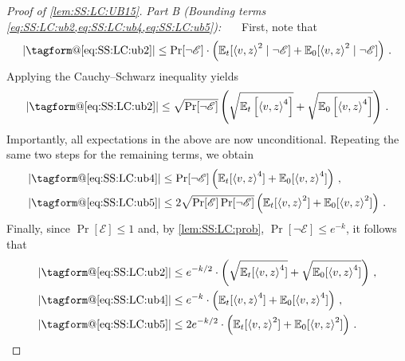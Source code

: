 \documentclass[11pt,letterpaper]{article}
\makeatletter
\theoremstyle{plain}
\theoremstyle{definition}
\theoremstyle{remark}
\renewcommand{\eqref}[1]{\textup{\eqrefform@{\ref{#1}}}}
\let\eqrefform@\tagform@
\def\abs#1{\left| #1 \right|}
\newcommand{\sinsquare}[1]{\ensuremath{[#1]}}
\newcommand{\inparen}[1]{\ensuremath{\left(#1\right)}}
\newcommand{\insquare}[1]{\ensuremath{\left[#1\right]}}
\newcommand{\inangle}[1]{\left\langle#1\right\rangle}
\newcommand{\evE}{\ensuremath{\mathscr{E}}}
\newcommand{\E}{\operatornamewithlimits{\mathbb{E}}}
\newcommand{\Ex}{\E}
\newcommand{\itparagraph}[1]{\medskip \noindent\textit{#1}~}
\newcommand{\paragraphit}[1]{\itparagraph{#1}}
\makeatother
\begin{document}
{{\begin{proof}[Proof of \cref{lem:SS:LC:UB15}]
        \paragraphit{Part B (Bounding terms \cref{eq:SS:LC:ub2,eq:SS:LC:ub4,eq:SS:LC:ub5}):}~~
            First, note that
            \[
                \abs{\eqref{eq:SS:LC:ub2}}
                \leq 
                \Pr[\lnot\evE]\cdot 
                \inparen{ 
                    \Ex\nolimits_{t}\sinsquare{\inangle{v, z}^2\mid \lnot\evE}
                    +
                    \Ex\nolimits_{0}\sinsquare{\inangle{v, z}^2\mid \lnot\evE}
                }
                \,.
            \]
            Applying the Cauchy--Schwarz inequality yields
            \[
                \abs{\eqref{eq:SS:LC:ub2}}
                \leq 
                \sqrt{\Pr[\lnot\evE]}\inparen{ 
                    \sqrt{\Ex\nolimits_{t}\insquare{\inangle{v, z}^4}}
                    +
                    \sqrt{\Ex\nolimits_{0}\insquare{\inangle{v, z}^4}}
                }
                \,.
            \]
            Importantly, all expectations in the above are now unconditional. Repeating the same two steps for the remaining terms, we obtain
            \begin{align*}
                \abs{\eqref{eq:SS:LC:ub4}}
                    &\leq 
                    \Pr[\lnot\evE]
                    \inparen{
                        {\Ex\nolimits_{t}\sinsquare{{\inangle{v, z}}^4}}
                        +
                        {\Ex\nolimits_{0}\sinsquare{{\inangle{v, z}}^4}}
                    }\,,\\
                \abs{\eqref{eq:SS:LC:ub5}}
                    &\leq 
                    2\sqrt{\Pr[\evE]\Pr[\lnot\evE]}
                    \inparen{
                        {\Ex\nolimits_{t}\sinsquare{\inangle{v, z}^2}}
                        +
                        {\Ex\nolimits_{0}\sinsquare{\inangle{v, z}^2}}
                    }\,.
            \end{align*}
            Finally, since $\Pr[\evE]\le 1$ and, by \cref{lem:SS:LC:prob}, $\Pr[\lnot\evE]\le e^{-k}$, it follows that
            \begin{align*}
                \abs{\eqref{eq:SS:LC:ub2}}
                    &\leq 
                    e^{-k/2}\cdot \inparen{ 
                        \sqrt{\Ex\nolimits_{t}\sinsquare{\inangle{v, z}^4}}
                        +
                        \sqrt{\Ex\nolimits_{0}\sinsquare{\inangle{v, z}^4}}
                    }\,,\\
                \abs{\eqref{eq:SS:LC:ub4}}
                    &\leq 
                    e^{-k}\cdot 
                    \inparen{
                        {\Ex\nolimits_{t}\sinsquare{{\inangle{v, z}}^4}}
                        +
                        {\Ex\nolimits_{0}\sinsquare{{\inangle{v, z}}^4}}
                    }\,,\\
                \abs{\eqref{eq:SS:LC:ub5}}
                    &\leq 
                    2e^{-k/2}\cdot 
                    \inparen{
                        {\Ex\nolimits_{t}\sinsquare{\inangle{v, z}^2}}
                        +
                        {\Ex\nolimits_{0}\sinsquare{\inangle{v, z}^2}}
                    }\,.
            \end{align*}
        \end{proof}
        
}}
\end{document}

